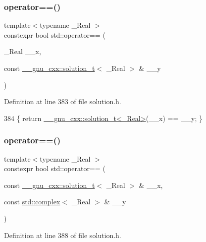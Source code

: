 \subsubsection{\texorpdfstring{operator==()}{operator==()}\hspace{0.1cm}{\footnotesize\ttfamily [3/5]}}
{\footnotesize\ttfamily template$<$typename \+\_\+\+Real $>$ \\
constexpr bool std\+::operator== (\begin{DoxyParamCaption}\item[{\+\_\+\+Real}]{\+\_\+\+\_\+x,  }\item[{const \hyperlink{namespace____gnu__cxx_ae20ea642de50eb361074c62676b0159c}{\+\_\+\+\_\+gnu\+\_\+cxx\+::solution\+\_\+t}$<$ \+\_\+\+Real $>$ \&}]{\+\_\+\+\_\+y }\end{DoxyParamCaption})}



Definition at line 383 of file solution.\+h.


\begin{DoxyCode}
384     \{ \textcolor{keywordflow}{return} \hyperlink{namespace____gnu__cxx_ae20ea642de50eb361074c62676b0159c}{\_\_gnu\_cxx::solution\_t<\_Real>}(\_\_x) == \_\_y; \}
\end{DoxyCode}
\mbox{\label{namespacestd_a7c9ad0c2dd7b387d13d1c5efead8a864}} 
\subsubsection{\texorpdfstring{operator==()}{operator==()}\hspace{0.1cm}{\footnotesize\ttfamily [4/5]}}
{\footnotesize\ttfamily template$<$typename \+\_\+\+Real $>$ \\
constexpr bool std\+::operator== (\begin{DoxyParamCaption}\item[{const \hyperlink{namespace____gnu__cxx_ae20ea642de50eb361074c62676b0159c}{\+\_\+\+\_\+gnu\+\_\+cxx\+::solution\+\_\+t}$<$ \+\_\+\+Real $>$ \&}]{\+\_\+\+\_\+x,  }\item[{const \hyperlink{classstd_1_1complex}{std\+::complex}$<$ \+\_\+\+Real $>$ \&}]{\+\_\+\+\_\+y }\end{DoxyParamCaption})}



Definition at line 388 of file solution.\+h.


